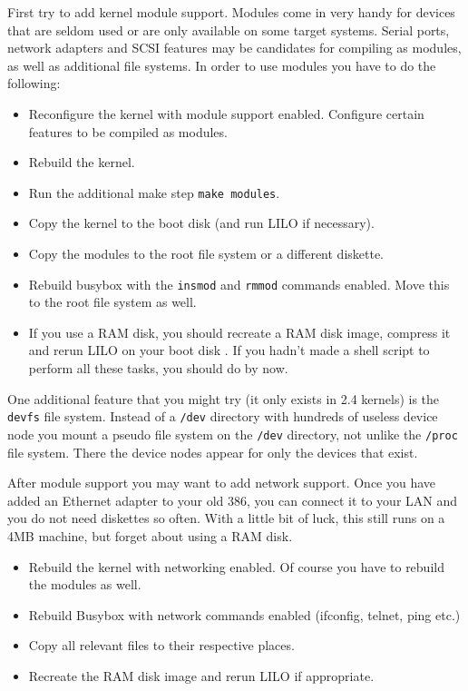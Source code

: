 \documentclass[12pt,a4paper]{article}
\begin{document}
First try to add kernel module support. Modules come in very handy for
devices that are seldom used or are only available on some target
systems. Serial ports, network adapters and SCSI features may be
candidates for compiling as modules, as well as additional file
systems. In order to use modules you have to
do the following:
\begin{itemize}
\item Reconfigure the kernel with module support enabled. Configure
  certain features to be compiled as modules.
\item Rebuild the kernel.
\item Run the additional make step {\tt make modules}. 
\item Copy the kernel to the boot disk (and run LILO if necessary).
\item Copy the modules to the root file system or a different
  diskette.
\item Rebuild busybox with the {\tt insmod} and {\tt rmmod} commands
  enabled. Move this to the root file system as well.
\item If you use a RAM disk, you should recreate a RAM disk image,
  compress it and rerun LILO on your boot disk . If you hadn't made a
  shell script to perform all these tasks, you should do by now.
\end{itemize}
One additional feature that you might try (it only exists in 2.4
kernels) is the {\tt devfs} file system. Instead of a {\tt /dev}
directory with hundreds of useless device node  you mount a pseudo file
system on the {\tt /dev} directory, not unlike the {\tt /proc} file
system. There the device nodes appear for only the devices that exist.

After module support you may want to add network support. Once you
have added an Ethernet adapter to your old 386, you can connect it to
your LAN and you do not need diskettes so often. With a little bit of
luck, this still runs on a 4MB machine, but forget about using a RAM
disk.
\begin{itemize}
\item Rebuild the kernel with networking enabled. Of course you have
  to rebuild the modules as well.
\item Rebuild Busybox with network commands enabled (ifconfig, telnet,
  ping etc.)
\item Copy all relevant files to their respective places.
\item Recreate the RAM disk image and rerun LILO if appropriate.
\end{itemize} 
\end{document}
